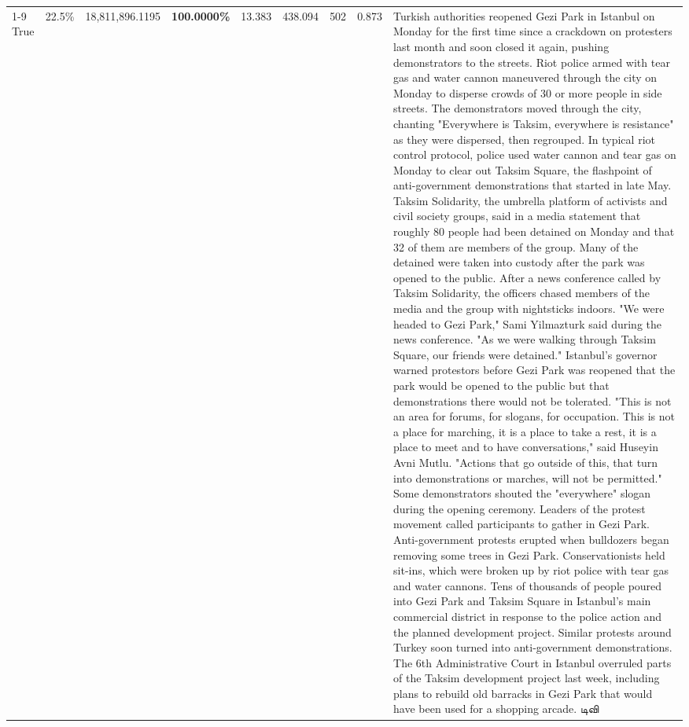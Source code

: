 \begin{table}[H]
\begin{tabular}{lllrlllll}
\cline{1-9}
True & 22.5\% & 18,811,896.1195 & \bfseries \color{red} 100.0000\% & 13.383 & 438.094 & 502 & 0.873 & Turkish authorities reopened Gezi Park in Istanbul on Monday for the first time since a crackdown on protesters last month and soon closed it again, pushing demonstrators to the streets. Riot police armed with tear gas and water cannon maneuvered through the city on Monday to disperse crowds of 30 or more people in side streets. The demonstrators moved through the city, chanting "Everywhere is Taksim, everywhere is resistance" as they were dispersed, then regrouped. In typical riot control protocol, police used water cannon and tear gas on Monday to clear out Taksim Square, the flashpoint of anti-government demonstrations that started in late May. Taksim Solidarity, the umbrella platform of activists and civil society groups, said in a media statement that roughly 80 people had been detained on Monday and that 32 of them are members of the group. Many of the detained were taken into custody after the park was opened to the public. After a news conference called by Taksim Solidarity, the officers chased members of the media and the group with nightsticks indoors. "We were headed to Gezi Park," Sami Yilmazturk said during the news conference. "As we were walking through Taksim Square, our friends were detained." Istanbul's governor warned protestors before Gezi Park was reopened that the park would be opened to the public but that demonstrations there would not be tolerated. "This is not an area for forums, for slogans, for occupation. This is not a place for marching, it is a place to take a rest, it is a place to meet and to have conversations," said Huseyin Avni Mutlu. "Actions that go outside of this, that turn into demonstrations or marches, will not be permitted." Some demonstrators shouted the "everywhere" slogan during the opening ceremony. Leaders of the protest movement called participants to gather in Gezi Park. Anti-government protests erupted when bulldozers began removing some trees in Gezi Park. Conservationists held sit-ins, which were broken up by riot police with tear gas and water cannons. Tens of thousands of people poured into Gezi Park and Taksim Square in Istanbul's main commercial district in response to the police action and the planned development project. Similar protests around Turkey soon turned into anti-government demonstrations. The 6th Administrative Court in Istanbul overruled parts of the Taksim development project last week, including plans to rebuild old barracks in Gezi Park that would have been used for a shopping arcade. டிவி \\

\end{tabular}
\end{table}

